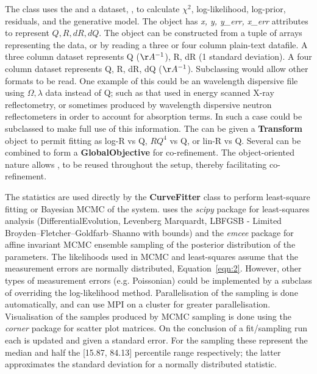 \documentclass[12pt]{article}
\begin{document}
The \Objective class uses the \ReflectModel and a dataset, \DataD, to calculate $\chi^2$, log-likelihood, log-prior, residuals, and the generative model.
The \DataD object has \emph{x, y, y\_err, x\_err} attributes to represent $Q, R, dR, dQ$. The \DataD object can be constructed from a tuple of arrays representing the data, or by reading a three or four column plain-text datafile. A three column dataset represents Q ($\AA^{-1}$), R, dR (1 standard deviation). A four column dataset represents Q, R, dR, dQ ($\AA^{-1}$). Subclassing \DataD would allow other formats to be read. One example of this could be an wavelength dispersive file using $\Omega, \lambda$ data instead of Q; such as that used in energy scanned X-ray reflectometry, or sometimes produced by wavelength dispersive neutron reflectometers in order to account for absorption terms. In such a case \ReflectModel could be subclassed to make full use of this information.
The \Objective can be given a \textbf{Transform} object to permit fitting as log-R vs Q, $RQ^4$ vs Q, or lin-R vs Q. Several \Objective can be combined to form a \textbf{GlobalObjective} for co-refinement. The object-oriented nature allows \Parameter, \Component to be reused throughout the setup, thereby facilitating co-refinement.

The \Objective statistics are used directly by the \textbf{CurveFitter} class to perform least-square fitting or Bayesian MCMC of the system.  uses the \emph{scipy} package for least-squares analysis (DifferentialEvolution, Levenberg Marquardt, LBFGSB - Limited Broyden–Fletcher–Goldfarb–Shanno with bounds) and the  \emph{emcee} package \cite{emcee} for affine invariant MCMC ensemble sampling of the posterior distribution of the parameters. The likelihoods used in MCMC and least-squares assume that the measurement errors are normally distributed, Equation~\ref{eqn:2}. However, other types of measurement errors (e.g. Poissonian) could be implemented by a subclass of \Objective  overriding the log-likelihood method.
Parallelisation of the sampling is done automatically, and can use MPI on a cluster for greater parallelisation. Visualisation of the samples produced by MCMC sampling is done using the \emph{corner} package \cite{corner} for scatter plot matrices. On the conclusion of a fit/sampling run each \Parameter is updated and given a standard error. For the sampling these represent the median and half the [15.87, 84.13] percentile range respectively; the latter approximates the standard deviation for a normally distributed statistic.
\end{document}
